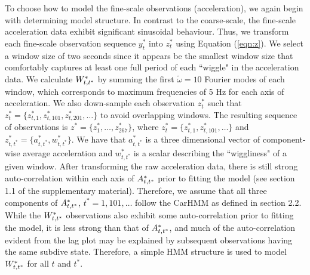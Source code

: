 To choose how to model the fine-scale observations (acceleration), we again begin with determining model structure. In contrast to the coarse-scale, the fine-scale acceleration data exhibit significant sinusoidal behaviour. Thus, we transform each fine-scale observation sequence $y_t^*$ into $z_t^*$ using Equation (\ref{eqn:z}). We select a window size of two seconds since it appears be the smallest window size that comfortably captures at least one full period of each ``wiggle" in the acceleration data.
%
We calculate $W^*_{t,t^*}$ by summing the first $\tilde \omega = 10$ Fourier modes of each window, which corresponds to maximum frequencies of 5 Hz for each axis of acceleration. We also down-sample each observation $z^*_t$ such that $z^*_t = \Big\{z^*_{t,1},z^*_{t,101},z^*_{t,201},\ldots\Big\}$ to avoid overlapping windows. The resulting sequence of observations is $z^* = \Big\{z^*_1,\ldots,z^*_{267}\Big\}$, where $z^*_t = \Big\{z^*_{t,1},z^*_{t,101},\ldots\Big\}$ and $z^*_{t,t^*} = \{a^*_{t,t^*},w^*_{t,t^*}\}$. We have that $a^*_{t,t^*}$ is a three dimensional vector of component-wise average acceleration and $w^*_{t,t^*}$ is a scalar describing the ``wiggliness" of a given window.
%
After transforming the raw acceleration data, there is still strong auto-correlation within each axis of $A^*_{t,t^*}$ prior to fitting the model (see section 1.1 of the supplementary material). Therefore, we assume that all three components of $A^*_{t,t^*}$, $t^* = 1,101,\ldots$ follow the CarHMM as defined in section 2.2. 
%
%
While the $W^*_{t,t^*}$ observations also exhibit some auto-correlation prior to fitting the model, it is less strong than that of $A^*_{t,t^*}$, and 
much of the auto-correlation evident from the lag plot may be explained by subsequent observations having the same subdive state. Therefore, a simple HMM structure is used to model $W^*_{t,t^*}$ for all $t$ and $t^*$. 
%
%

